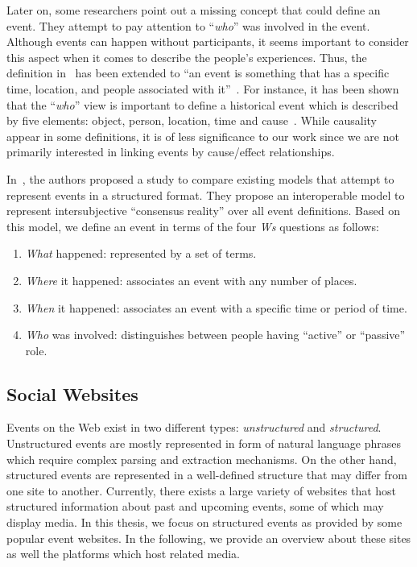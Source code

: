 Later on, some researchers point out a missing concept that could define an event. They attempt to pay attention to ``\emph{who}'' was involved in the event. Although events can happen without participants, it seems important to consider this aspect when it comes to describe the people's experiences. Thus, the definition in~\cite{Allan:1998} has been extended to ``an event is something that has a specific time, location, and people associated with it''~\cite{Allan:2002}. For instance, it has been shown that the ``\emph{who}'' view is important to define a historical event which is described by five elements: object, person, location, time and cause~\cite{Nakahira:WWW07}. While causality appear in some definitions, it is of less significance to our work since we are not primarily interested in linking events by cause/effect relationships. 

In~\cite{Shaw:ASWC09}, the authors proposed a study to compare existing models that attempt to represent events in a structured format. They propose an interoperable model to represent
intersubjective ``consensus reality'' over all event definitions. Based on this model, we define an event in terms of the four \emph{Ws} questions as follows:

\begin{enumerate}
\item \emph{What} happened: represented by a set of terms.
\item \emph{Where} it happened: associates an event with any number of places.
\item \emph{When} it happened:  associates an event with a specific time or period of time.
\item \emph{Who} was involved: distinguishes between people having ``active'' or ``passive'' role.
\end{enumerate}

\subsection{Social Websites}
Events on the Web exist in two different types: \textit{unstructured} and \textit{structured}. Unstructured events are mostly represented in form of natural language phrases which require complex parsing and extraction mechanisms. On the other hand, structured events are represented in a well-defined structure that may differ from one site to another. Currently, there exists a large variety of websites that host structured information about past and upcoming events, some of which may display media. In this thesis, we focus on structured events as provided by some popular event websites. In the following, we provide an overview about these sites as well the platforms which host related media.

